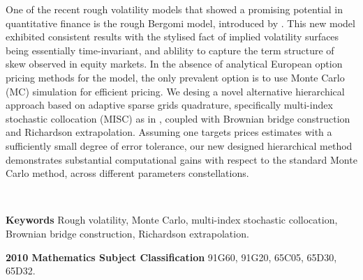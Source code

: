 One of the recent rough volatility models that showed a promising potential in quantitative finance   is the rough Bergomi model, introduced by \cite{bayer2016pricing}. This new model exhibited consistent results with the stylised fact of implied volatility surfaces being essentially time-invariant, and  ablility to capture the term structure of skew observed in equity markets. In the absence of analytical European option pricing methods for the model,  the only prevalent option is to use Monte Carlo (MC) simulation for efficient pricing. We desing a novel alternative hierarchical approach based on adaptive sparse grids quadrature, specifically  multi-index stochastic collocation (MISC) as in  \cite{haji2016multi}, coupled with Brownian bridge construction and Richardson extrapolation.  Assuming one targets prices estimates with a sufficiently small degree of error tolerance, our new designed hierarchical  method  demonstrates substantial computational gains with respect to the standard Monte Carlo method, across different parameters constellations.

\

\textbf{Keywords} Rough volatility, Monte Carlo, multi-index stochastic collocation, Brownian bridge construction, Richardson extrapolation.

\textbf{2010 Mathematics Subject Classification} 	91G60, 	91G20, 65C05, 65D30, 65D32.